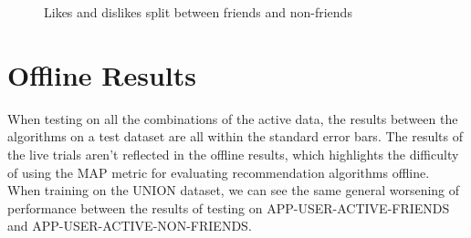 \begin{figure}[h!]
\caption{Likes and dislikes split between friends and non-friends}
\end{figure}

\section{Offline Results}

When testing on all the combinations of the active data, the results between the algorithms on a test dataset are all within the standard error bars. The results of the live trials aren't reflected in the offline results, which highlights the difficulty of using the MAP metric for evaluating recommendation algorithms offline.
\\

When training on the UNION dataset, we can see the same general worsening of performance between the results of testing on APP-USER-ACTIVE-FRIENDS and APP-USER-ACTIVE-NON-FRIENDS. 

